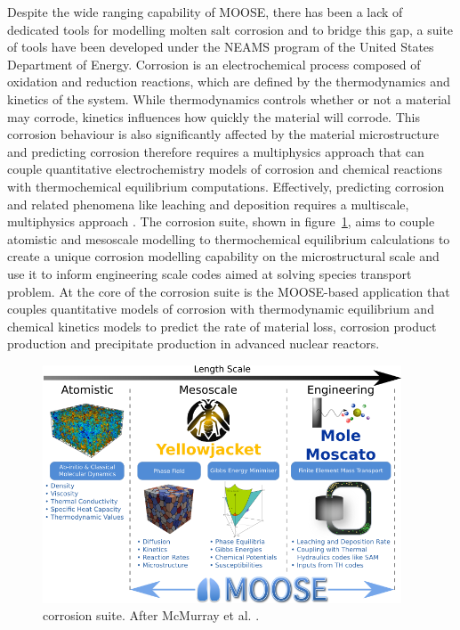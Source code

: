 	Despite the wide ranging capability of MOOSE, there has been a lack of dedicated tools for modelling molten salt corrosion and to bridge this gap, a suite of tools have been developed under the NEAMS program of the United States Department of Energy. Corrosion is an electrochemical process composed of oxidation and reduction reactions, which are defined by the thermodynamics and kinetics of the system. While thermodynamics controls whether or not a material may corrode, kinetics influences how quickly the material will corrode. This corrosion behaviour is also significantly affected by the material microstructure and predicting corrosion therefore requires a multiphysics approach that can couple quantitative electrochemistry models of corrosion and chemical reactions with thermochemical equilibrium computations. Effectively, predicting corrosion and related phenomena like leaching and deposition requires a multiscale, multiphysics approach \cite{Mcmurray:2018aa}. The corrosion suite, shown in figure~\ref{fig:yj_suite}, aims to couple atomistic and mesoscale modelling to thermochemical equilibrium calculations to create a unique corrosion modelling capability on the microstructural scale and use it to inform engineering scale codes aimed at solving species transport problem. At the core of the corrosion suite is the MOOSE-based application {\YJ} that couples quantitative models of corrosion with thermodynamic equilibrium and chemical kinetics models to predict the rate of material loss, corrosion product production and precipitate production in advanced nuclear reactors. 
	\begin{figure}[htb]
		\centering
		\includegraphics[width=0.95\textwidth]{figures/chapter-1/Yellowjacket_Suite.png}
		\caption[{\YJ} corrosion suite.]{{\YJ} corrosion suite. After McMurray et al. \cite{McMurray:2020aa}.}
		\label{fig:yj_suite}
	\end{figure}
 
